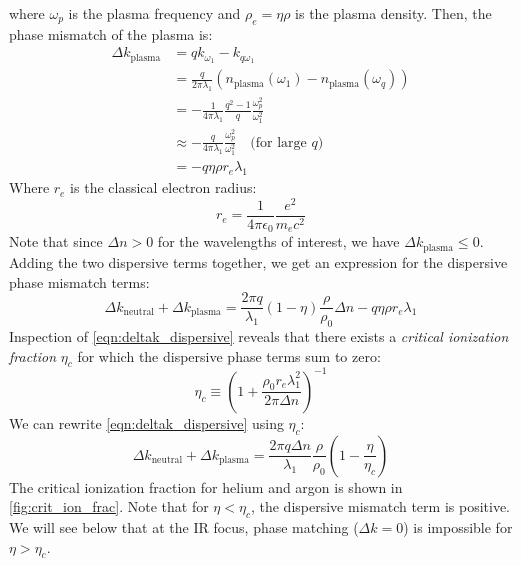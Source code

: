 where $\omega_p$ is the plasma frequency and $\rho_e = \eta \rho$ is the plasma density. Then, the phase mismatch of the plasma is:
\begin{align}
\Delta k_{\textrm{plasma}} &= q k_{\omega_1} - k_{q \omega_1} \nonumber \\
&= \frac{q}{2 \pi \lambda_1} (n_{\textrm{plasma}}(\omega_1) -n_{\textrm{plasma}}(\omega_q) ) \nonumber \\
&= - \frac{1}{4 \pi \lambda_1} \frac{q^2-1}{q} \frac{\omega_p^2}{\omega_1^2} \nonumber \\
&\approx - \frac{q}{4 \pi \lambda_1} \frac{\omega_p^2}{\omega_1^2} \quad \textrm{(for large $q$)} \nonumber \\
&= - q \eta \rho  r_e \lambda_1
\end{align}
Where $r_e$ is the classical electron radius:
\begin{equation}
r_e = \frac{1}{4 \pi \epsilon_0} \frac{e^2}{m_e c^2}
\end{equation}
Note that since $\Delta n > 0$ for the wavelengths of interest, we have $\Delta k_{\textrm{plasma}} \le 0$. Adding the two dispersive terms together, we get an expression for the dispersive phase mismatch terms:
\begin{equation}
\Delta k_{\textrm{neutral}} + \Delta k_{\textrm{plasma}} = \frac{2 \pi q}{\lambda_1} (1-\eta) \frac{\rho}{\rho_0}\Delta n - q \eta \rho  r_e \lambda_1
\label{eqn:deltak_dispersive}
\end{equation}
Inspection of \cref{eqn:deltak_dispersive} reveals that there exists a \textit{critical ionization fraction} $\eta_c$ for which the dispersive phase terms sum to zero:
\begin{equation}
\eta_c \equiv \left( 1+ \frac{\rho_0 r_e \lambda_1^2}{2 \pi \Delta n} \right)^{-1}
\end{equation}
We can rewrite \cref{eqn:deltak_dispersive} using $\eta_c$:
\begin{equation}
\Delta k_{\textrm{neutral}} + \Delta k_{\textrm{plasma}} = \frac{2 \pi q \Delta n}{\lambda_1} \frac{\rho}{\rho_0} \left(1 - \frac{\eta}{\eta_c}\right)
\end{equation}
The critical ionization fraction for helium and argon is shown in \cref{fig:crit_ion_frac}. Note that for $\eta < \eta_c$, the dispersive mismatch term is positive. We will see below that at the IR focus, phase matching ($\Delta k = 0$) is impossible for $\eta > \eta_c$.

